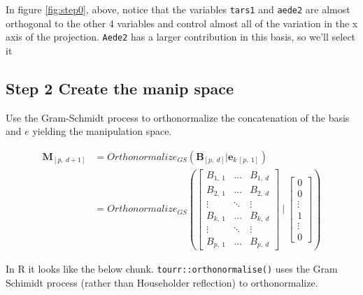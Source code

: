 \documentclass{monashthesis}
\begin{document}
In figure \ref{fig:step0}, above, notice that the variables \texttt{tars1} and \texttt{aede2} are almost orthogonal to the other 4 variables and control almost all of the variation in the x axis of the projection. \texttt{Aede2} has a larger contribution in this basis, so we'll select it

\hypertarget{step-2-create-the-manip-space}{%
\subsection{Step 2 Create the manip space}\label{step-2-create-the-manip-space}}

Use the Gram-Schmidt process to orthonormalize the concatenation of the basis and \(e\) yielding the manipulation space.

\begin{align*}
  \textbf{M}_{[p,~d+1]}
  &= Orthonormalize_{GS}( \textbf{B}_{[p,~d]}|\textbf{e}_{k~[p,~1]} ) \\
  &= Orthonormalize_{GS}
  \left(
    \begin{bmatrix}
      B_{1,~1} & \dots  & B_{1,~d} \\
      B_{2,~1} & \dots  & B_{2,~d} \\
      \vdots   & \ddots & \vdots   \\
      B_{k,~1} & \dots  & B_{k,~d} \\
      \vdots   & \ddots & \vdots   \\
      B_{p,~1} & \dots  & B_{p,~d}
    \end{bmatrix}
  ~|~
    \begin{bmatrix}
      0 \\
      0 \\
      \vdots \\
      1 \\
      \vdots \\
      0
    \end{bmatrix}
  \right)
\end{align*}

In R it looks like the below chunk. \texttt{tourr::orthonormalise()} uses the Gram Schimidt process (rather than Householder reflection) to orthonormalize.

\begin{Shaded}
\begin{Highlighting}[]
\StringTok{ }\NormalTok{(}\NormalTok{, } 
\StringTok{ }
\StringTok{ }\OperatorTok{::}\NormalTok{(}
\end{Highlighting}
\end{Shaded}
\end{document}
